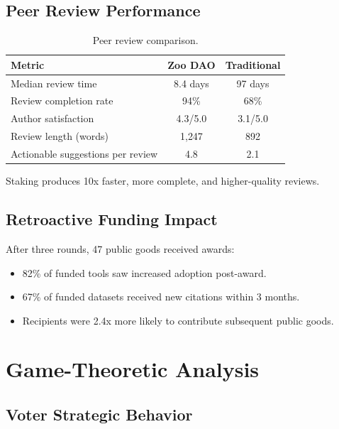 \documentclass[11pt,a4paper]{article}
\begin{document}
\subsection{Peer Review Performance}

\begin{table}[H]
\centering
\caption{Peer review comparison.}
\label{tab:review_compare}
\begin{tabular}{lcc}
\toprule
\textbf{Metric} & \textbf{Zoo DAO} & \textbf{Traditional} \\
\midrule
Median review time & 8.4 days & 97 days \\
Review completion rate & 94\% & 68\% \\
Author satisfaction & 4.3/5.0 & 3.1/5.0 \\
Review length (words) & 1{,}247 & 892 \\
Actionable suggestions per review & 4.8 & 2.1 \\
\bottomrule
\end{tabular}
\end{table}

Staking produces 10x faster, more complete, and higher-quality reviews.

\subsection{Retroactive Funding Impact}

After three rounds, 47 public goods received awards:
\begin{itemize}
  \item 82\% of funded tools saw increased adoption post-award.
  \item 67\% of funded datasets received new citations within 3 months.
  \item Recipients were 2.4x more likely to contribute subsequent
    public goods.
\end{itemize}


\section{Game-Theoretic Analysis}
\label{sec:game_theory}

\subsection{Voter Strategic Behavior}
\end{document}
